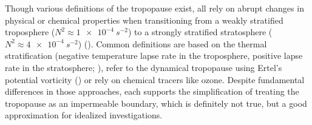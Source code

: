 Though various definitions of the tropopause exist, all rely on abrupt changes in physical or chemical properties when transitioning from a weakly stratified troposphere ($N^2 \approx \SI{1e-4}{s^{-2}}$) to a strongly stratified stratosphere ($N^2 \approx \SI{4e-4}{s^{-2}}$) (\cite{birner_fine-scale_2006}). Common definitions are based on the thermal stratification (negative temperature lapse rate in the troposphere, positive  lapse rate in the stratosphere; \cite{wmo_meteorology_1957}), refer to the dynamical tropopause using Ertel's potential vorticity (\cite{wmo_atmospheric_1986}) or rely on chemical tracers like ozone. Despite fundamental differences in those approaches, each supports the simplification of treating the tropopause as an impermeable boundary, which is definitely not true, but a good approximation for idealized investigations. 

